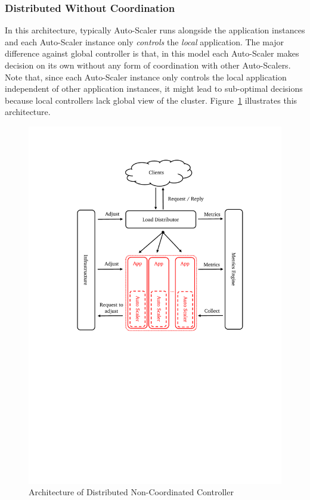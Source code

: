 \subsubsection{Distributed Without Coordination}
In this architecture, typically Auto-Scaler runs alongside the application instances and each Auto-Scaler instance only \emph{controls} the \emph{local} application. The major difference against global controller is that, in this model each Auto-Scaler makes decision on its own without any form of coordination with other Auto-Scalers. Note that, since each Auto-Scaler instance only controls the local application independent of other application instances, it might lead to sub-optimal decisions because local controllers lack global view of the cluster. Figure~\ref{fig:auto-scaler-dist-wo-coord} illustrates this architecture.
\begin{figure}[!htbp]
    \includegraphics[clip,trim=3cm 12.2cm 2.5cm 2.5cm]{auto-scaler-full-dist.pdf}
    \centering
    \caption{Architecture of Distributed Non-Coordinated Controller}
    \label{fig:auto-scaler-dist-wo-coord}
\end{figure}
\clearpage
